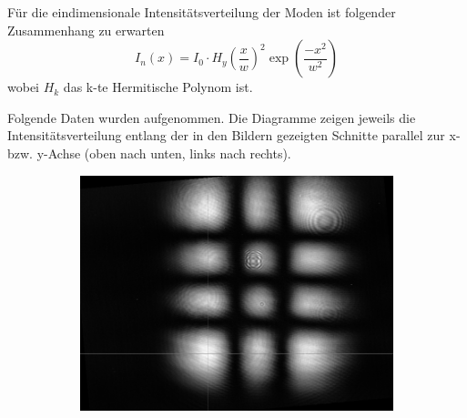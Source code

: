 \documentclass[bigchapter,colorback,accentcolor=tud4b,linedtoc,11pt]{tudreport}
\numberwithin{equation}{subsection}
\begin{document}
Für die eindimensionale Intensitätsverteilung der Moden ist folgender Zusammenhang zu erwarten
$$I_{n}(x) = I_0 \cdot  H_y \left( \frac{x}{w} \right)^2 \exp \left( \frac{-x^2}{w^2} \right)  $$
\cite{TransModeIntensity}
wobei $H_k$ das k-te Hermitische Polynom ist.

Folgende Daten wurden aufgenommen. Die Diagramme zeigen jeweils die Intensitätsverteilung entlang der in den Bildern gezeigten Schnitte parallel zur x- bzw. y-Achse (oben nach unten, links nach rechts).

\begin{figure}[h]
        \centering
        \begin{subfigure}{0.5\textwidth}
                \includegraphics[width=\textwidth]{img/TEM23.png}
        \end{subfigure}%
        ~ %
        \begin{subfigure}{0.5\textwidth}
        \end{subfigure}
\end{figure}
\end{document}

